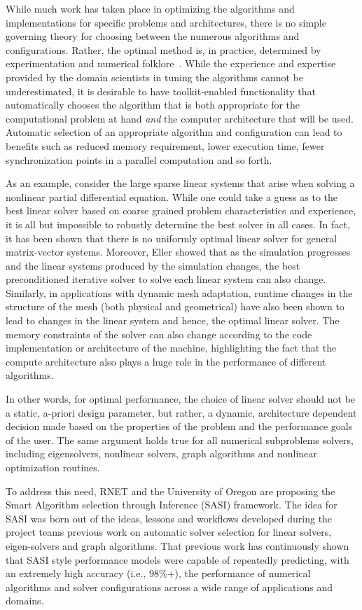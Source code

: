 While much work has taken place in optimizing the algorithms and implementations for specific problems and architectures, there is no simple governing theory for choosing between the numerous algorithms and configurations. Rather, the optimal method is, in practice, determined by experimentation and numerical folklore~\cite{EijkFuen2010:multistage}. While the experience and expertise provided by the domain scientists in tuning the algorithms cannot be underestimated, it is desirable to have toolkit-enabled functionality that automatically chooses the algorithm that is both appropriate for the computational problem at hand \emph{and} the computer architecture that will be used. Automatic selection of an appropriate algorithm and configuration can lead to benefits such as reduced memory requirement, lower execution time, fewer synchronization points in a parallel computation and so forth. 

As an example, consider the large sparse linear systems that arise when solving a nonlinear partial differential equation. While one could take a guess as to the best linear solver based on coarse grained problem characteristics and experience, it is all but impossible to robustly determine the best solver in all cases. In fact, it has been shown that there is no uniformly optimal linear solver for general matrix-vector systems. Moreover, Eller \cite{Eller2012} showed that as the simulation progresses and the linear systems produced by the simulation changes, the best preconditioned iterative solver to solve each linear system can also change. Similarly, in applications with dynamic mesh adaptation, runtime changes in the structure of the mesh (both physical and geometrical) have also been shown to lead to changes in the linear system and hence, the optimal linear solver. The memory constraints of the solver can also change according to the code implementation or architecture of the machine, highlighting the fact that the compute architecture also plays a huge role in the performance of different algorithms.

In other words, for optimal performance, the choice of linear solver should not be a static, a-priori design parameter, but rather, a dynamic, architecture dependent decision made based on the properties of the problem and the performance goals of the user. The same argument holds true for all numerical subproblems solvers, including eigensolvers, nonlinear solvers, graph algorithms and nonlinear optimization routines.      

To address this need, RNET and the University of Oregon are proposing the Smart Algorithm selection through Inference (SASI) framework. The idea for SASI was born out of the ideas, lessons and workflows developed during the project teams previous work on automatic solver selection for linear solvers, eigen-solvers and graph algorithms. That previous work has continuously shown that SASI style performance models were capable of repeatedly predicting, with an extremely high accuracy (i.e., 98\%+), the performance of numerical algorithms and solver configurations across a wide range of applications and domains.

